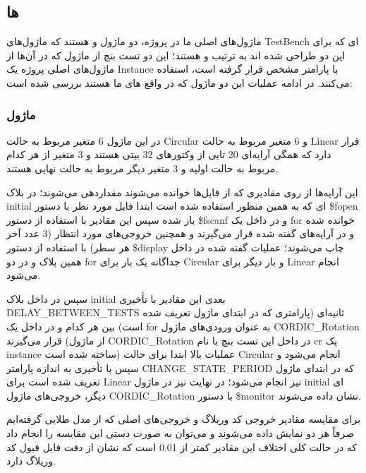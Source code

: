 \documentclass[12pt,titlepage,a4page , tikz , multi,table , svgnames,xcdraw]{article}
\begin{document}
\newpage

\subsection{  ها}

ماژول‌های اصلی ما در پروژه، دو ماژول  و  هستند که ماژول‌های TestBench ای که برای این دو طراحی شده اند به ترتیب   و   هستند؛ این دو تست بنچ از ماژول  که در آن‌ها از ماژول‌های اصلی پروژه یک Instance با پارامتر مشخص قرار گرفته است، استفاده می‌کنند. در ادامه عملیات این دو ماژول که در واقع  های ما هستند بررسی شده است:


\subsubsection{ماژول }


در این ماژول 6 متغیر مربوط به حالت Circular و 6 متغیر مربوط به حالت Linear قرار دارد که همگی آرایه‌ای 20 تایی از وکتورهای 32 بیتی هستند و 3 متغیر از هر کدام مربوط به حالت اولیه و 3 متغیر دیگر مربوط به حالت نهایی هستند.

این آرایه‌ها از روی مقادیری که از فایل‌ها خوانده می‌شوند مقداردهی می‌شوند؛ در بلاک initial ای که به همین منظور استفاده شده است ابتدا فایل مورد نظر با دستور \$fopen باز شده سپس این مقادیر با استفاده از دستور \$fscanf و در داخل یک for خوانده شده و در آرایه‌های گفته شده قرار می‌گیرند و همچنین خروجی‌های مورد انتظار (3 عدد آخر هر سطر) با استفاده از دستور \$display چاپ می‌شوند؛ عملیات گفته شده در داخل همین بلاک و در دو for جداگانه یک بار برای Circular و بار دیگر برای Linear انجام می‌شود.

سپس در داخل بلاک initial بعدی این مقادیر با تأخیری DELAY\_BETWEEN\_TESTS ثانیه‌ای (پارامتری که در ابتدای ماژول تعریف شده است) بین هر کدام و در داخل یک for به عنوان ورودی‌های ماژول CORDIC\_Rotation قرار می‌گیرند (از ماژول CORDIC\_Rotation در داخل این تست بنچ با نام cr یک instance ساخته شده است)
عملیات بالا ابتدا برای حالت Circular انجام می‌شود و سپس با تأخیری به اندازه پارامتر CHANGE\_STATE\_PERIOD که در ابتدای ماژول تعریف شده است برای Linear نیز انجام می‌شود؛ در نهایت نیز در ماژول initial ای دیگر، خروجی‌های ماژول CORDIC\_Rotation با دستور \$monitor نشان داده می‌شوند.

برای مقایسه مقادیر خروجی کد وریلاگ و خروجی‌های اصلی که از مدل طلایی گرفته‌ایم صرفاً هر دو نمایش داده می‌شوند و می‌توان به صورت دستی این مقایسه را انجام داد که در حالت کلی اختلاف این مقادیر کمتر از 0.01 است که نشان از دقت قابل قبول کد وریلاگ دارد.
\end{document}
